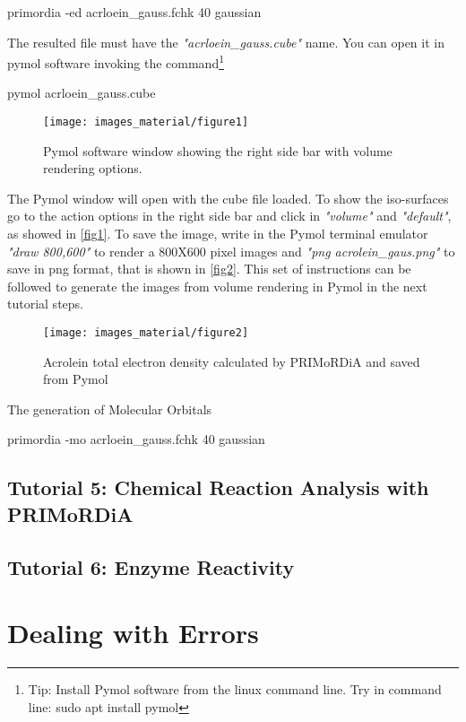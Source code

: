 \documentclass[a4paper,11pt]{refart}
\begin{document}
\hspace*{-\leftmarginwidth}
\begin{minipage}{\fullwidth}
	\begin{commandshell}primordia -ed acrloein_gauss.fchk 40 gaussian\end{commandshell}
\end{minipage}

The resulted file must have the \emph{"acrloein\_gauss.cube"} name. 
You can open it in pymol software invoking the command\footnote{Tip: Install Pymol software from the linux command line. Try in command line: sudo apt install pymol}

\hspace*{-\leftmarginwidth}
\begin{minipage}{\fullwidth}
	\begin{commandshell}pymol acrloein_gauss.cube\end{commandshell}
\end{minipage}

\begin{figure}[H]
	\texttt{[image: images\_material/figure1]}
	\caption{Pymol software window showing the right side bar with volume rendering options.}
	\label{fig1}
\end{figure}

The Pymol window will open with the cube file loaded. To show the iso-surfaces go to the action options in the right side bar and click in \emph{"volume"} and \emph{"default"}, as showed in \autoref{fig1}. To save the image, write in the Pymol terminal emulator   \emph{"draw 800,600"} to render a 800X600 pixel images and \emph{"png acrolein\_gaus.png"} to save in png format, that is shown in \autoref{fig2}. This set of instructions can be followed to generate the images from volume rendering in Pymol in the next tutorial steps. 

\begin{figure}[H]
	\texttt{[image: images\_material/figure2]}
	\caption{Acrolein total electron density calculated by PRIMoRDiA and saved from Pymol }
	\label{fig2}
\end{figure} 

The generation of Molecular Orbitals 


\hspace*{-\leftmarginwidth}
\begin{minipage}{\fullwidth}
	\begin{commandshell}primordia -mo acrloein_gauss.fchk  40 gaussian\end{commandshell}
\end{minipage}


\subsection{Tutorial 5: Chemical Reaction Analysis with PRIMoRDiA }


\subsection{Tutorial 6: Enzyme Reactivity }


\section{Dealing with Errors}
\end{document}
